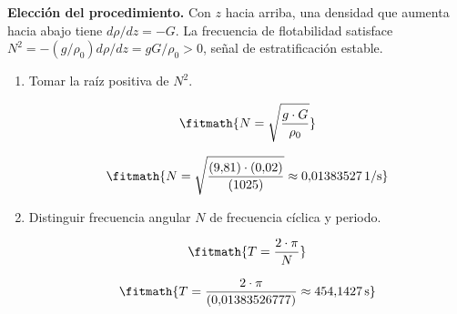 \noindent\textbf{Elección del procedimiento.} Con $z$ hacia arriba, una densidad que aumenta hacia abajo tiene $d\rho/dz=-G$. La frecuencia de flotabilidad satisface $N^2=-(g/\rho_0)d\rho/dz=gG/\rho_0>0$, señal de estratificación estable.

\begin{enumerate}

\item Tomar la raíz positiva de $N^2$.

\[\fitmath{N=\sqrt{\frac{g\cdot G}{\rho_{0}}}}\]

\[\fitmath{N=\sqrt{\frac{(9{,}81)\cdot (0{,}02)}{(1025)}}\approx 0{,}01383527\,\mathrm{1/s}}\]

\item Distinguir frecuencia angular $N$ de frecuencia cíclica y periodo.

\[\fitmath{T=\frac{2\cdot \pi}{N}}\]

\[\fitmath{T=\frac{2\cdot \pi}{(0{,}01383526777)}\approx 454{,}1427\,\mathrm{s}}\]

\end{enumerate}
